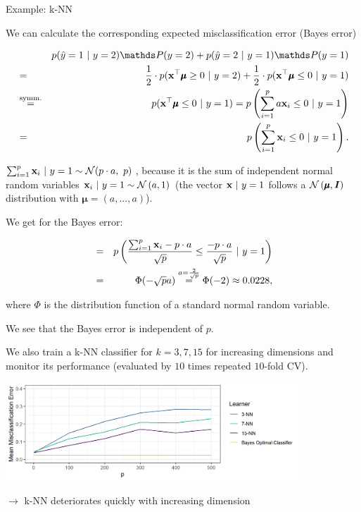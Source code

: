 \documentclass[11pt,compress,t,notes=noshow, xcolor=table]{beamer}
\begin{document}
\begin{vbframe}{Example: k-NN}
\framebreak 

We can calculate the corresponding expected misclassification error (Bayes error)

\begin{footnotesize}
\begin{eqnarray*}
&&  p(\hat y = 1 ~|~y = 2)\P(y = 2) + p(\hat y = 2 ~|~y = 1)\P(y = 1)\\
&=& \frac{1}{2} \cdot p(\xv^\top \pmb\mu \ge 0 ~|~ y = 2) + \frac{1}{2} \cdot p(\xv^\top \pmb\mu \le 0 ~|~ y = 1) \\
&\overset{\text{symm.}}{=}& p(\xv^\top \pmb\mu \le 0 ~|~ y = 1) = p\left(\sum_{i = 1}^p a \xv_i \le 0 ~|~ y = 1\right)\\
  &=& p\left(\sum_{i = 1}^p \xv_i \le 0 ~|~ y = 1\right). 
\end{eqnarray*}
\end{footnotesize}

$\sum_{i = 1}^p \mathbf{x}_i ~|~ y = 1\sim \mathcal{N}(p \cdot a,~ p)$\,, because it is the sum of independent normal random variables $\mathbf{x}_i ~|~ y = 1 \sim \mathcal{N}\left(a, 1\right)$ (the vector $\mathbf{x} ~|~ y = 1$ follows a $\mathcal{N}\left(\pmb\mu, \boldsymbol{I}\right)$ distribution with $\pmb\mu = \left(a, ..., a\right)$). 

\framebreak 

We get for the Bayes error: 

\begin{eqnarray*}
 &=& p\left(\frac{\sum_{i = 1}^p \mathbf{x}_i - p \cdot a}{\sqrt{p}} \le \frac{- p\cdot a}{\sqrt{p}} ~|~ y = 1\right) \\ &=& \Phi(- \sqrt{p} a) \overset{a = \frac{2}{\sqrt{p}}}{=} \Phi(- 2) \approx 0.0228,
\end{eqnarray*}

where $\Phi$ is the distribution function of a standard normal random variable. 

\lz 

We see that the Bayes error is independent of $p$. 


\framebreak

We also train a k-NN classifier for $k = 3, 7, 15$ for increasing dimensions and monitor its performance (evaluated by $10$ times repeated $10$-fold CV).
\medskip

\begin{center}
\includegraphics[width = 11cm ]{figure/knn_misclassification_plot.png}
\end{center}

$\to$ k-NN deteriorates quickly with increasing dimension


\end{vbframe}
\end{document}
